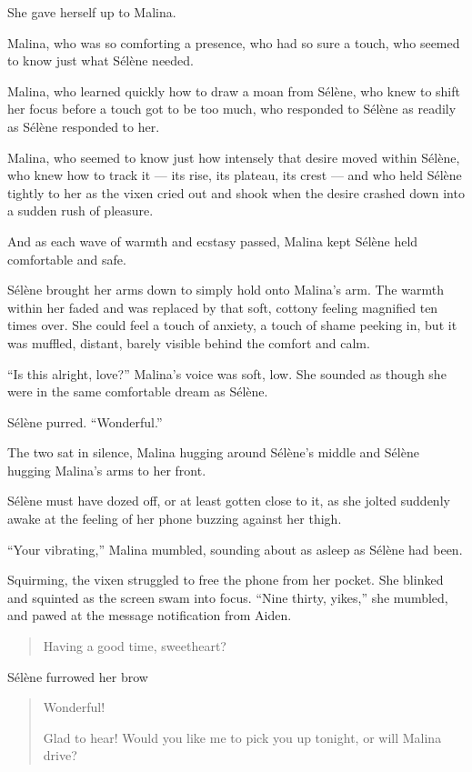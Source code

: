 She gave herself up to Malina.

Malina, who was so comforting a presence, who had so sure a touch, who seemed to know just what Sélène needed.

Malina, who learned quickly how to draw a moan from Sélène, who knew to shift her focus before a touch got to be too much, who responded to Sélène as readily as Sélène responded to her.

Malina, who seemed to know just how intensely that desire moved within Sélène, who knew how to track it --- its rise, its plateau, its crest --- and who held Sélène tightly to her as the vixen cried out and shook when the desire crashed down into a sudden rush of pleasure.

And as each wave of warmth and ecstasy passed, Malina kept Sélène held comfortable and safe.

Sélène brought her arms down to simply hold onto Malina's arm. The warmth within her faded and was replaced by that soft, cottony feeling magnified ten times over. She could feel a touch of anxiety, a touch of shame peeking in, but it was muffled, distant, barely visible behind the comfort and calm.

``Is this alright, love?'' Malina's voice was soft, low. She sounded as though she were in the same comfortable dream as Sélène.

Sélène purred. ``Wonderful.''

The two sat in silence, Malina hugging around Sélène's middle and Sélène hugging Malina's arms to her front.

\secdiv{}

\noindent Sélène must have dozed off, or at least gotten close to it, as she jolted suddenly awake at the feeling of her phone buzzing against her thigh.

``Your vibrating,'' Malina mumbled, sounding about as asleep as Sélène had been.

Squirming, the vixen struggled to free the phone from her pocket. She blinked and squinted as the screen swam into focus. ``Nine thirty, yikes,'' she mumbled, and pawed at the message notification from Aiden.

\begin{quote}
 Having a good time, sweetheart?
\end{quote}

Sélène furrowed her brow

\begin{quote}
 Wonderful!

 Glad to hear! Would you like me to pick you up tonight, or will Malina drive?
\end{quote}


